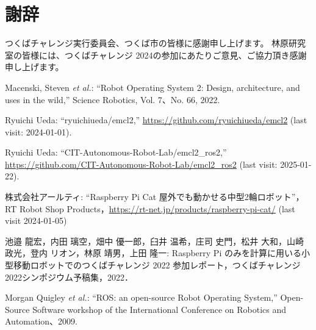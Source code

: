 \documentclass[twocolumn,9pt]{jsproceedings}
\begin{document}
\section*{謝辞}
つくばチャレンジ実行委員会、つくば市の皆様に感謝申し上げます。
林原研究室の皆様には、つくばチャレンジ 2024の参加にあたりご意見、ご協力頂き感謝申し上げます。

\footnotesize
\begin{thebibliography}{99}

  Macenski, Steven {\it et al.}: ``Robot Operating System 2: Design, architecture, and uses in the wild,''
  Science Robotics, Vol. 7、No. 66, 2022.

  Ryuichi Ueda: ``ryuichiueda/emcl2,'' \url{https://github.com/ryuichiueda/emcl2} (last visit: 2024-01-01).

  Ryuichi Ueda: ``CIT-Autonomous-Robot-Lab/emcl2\_ros2,'' \url{https://github.com/CIT-Autonomous-Robot-Lab/emcl2_ros2} (last visit: 2025-01-22).
  
 

  株式会社アールティ: ``Raspberry Pi Cat 屋外でも動かせる中型2輪ロボット''，
  RT Robot Shop Products，\url{https://rt-net.jp/products/raspberry-pi-cat/} (last visit 2024-01-05)

  池邉 龍宏，内田 璃空，畑中 優一郎，臼井 温希，庄司 史門，松井 大和，山崎 政光，登内 リオン，林原 靖男，上田 隆一: Raspberry Pi のみを計算に用いる小型移動ロボットでのつくばチャレンジ 2022 参加レポート，つくばチャレンジ2022シンポジウム予稿集，2022．

  Morgan Quigley {\it et al.}: ``ROS: an open-source Robot Operating System,''
  Open-Source Software workshop of the International Conference on Robotics and Automation、2009.





\end{thebibliography}
\end{document}
